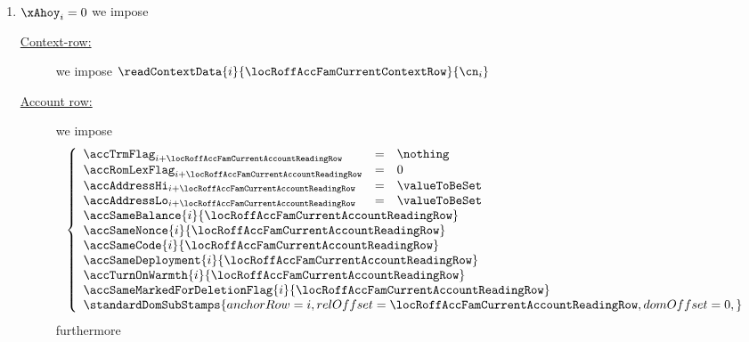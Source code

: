 \begin{description}
\begin{enumerate}
				\begin{enumerate}
					\item \If $\xAhoy_{i} = 0$ \Then we impose
						\begin{description}
							\item[\underline{Context-row:}]
								we impose
								$\readContextData {i}{\locRoffAccFamCurrentContextRow}{\cn_{i}}$
							\item[\underline{Account row:}]
								we impose
								\[
									\left\{ \begin{array}{lcl}
										\accTrmFlag      _{i + \locRoffAccFamCurrentAccountReadingRow} & = & \nothing      \\
										\accRomLexFlag   _{i + \locRoffAccFamCurrentAccountReadingRow} & = & 0             \\
										\accAddressHi    _{i + \locRoffAccFamCurrentAccountReadingRow} & = & \valueToBeSet \\
										\accAddressLo    _{i + \locRoffAccFamCurrentAccountReadingRow} & = & \valueToBeSet \\
										\multicolumn{3}{l}{\accSameBalance                     {i}{\locRoffAccFamCurrentAccountReadingRow}} \\
										\multicolumn{3}{l}{\accSameNonce                       {i}{\locRoffAccFamCurrentAccountReadingRow}} \\
										\multicolumn{3}{l}{\accSameCode                        {i}{\locRoffAccFamCurrentAccountReadingRow}} \\
										\multicolumn{3}{l}{\accSameDeployment                  {i}{\locRoffAccFamCurrentAccountReadingRow}} \\
										\multicolumn{3}{l}{\accTurnOnWarmth                    {i}{\locRoffAccFamCurrentAccountReadingRow}} \\
										\multicolumn{3}{l}{\accSameMarkedForDeletionFlag       {i}{\locRoffAccFamCurrentAccountReadingRow}} \\
										\multicolumn{3}{l}{
											\standardDomSubStamps {
												anchorRow        = i                                      ,
												relOffset        = \locRoffAccFamCurrentAccountReadingRow ,
												domOffset        = 0                                      ,
											}
										} \\
									\end{array} \right.
								\]
								furthermore
								\begin{enumerate}

\end{enumerate}
\end{description}
\end{enumerate}
\end{enumerate}
\end{description}
